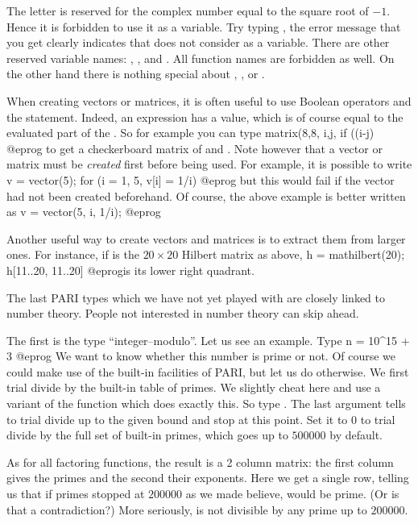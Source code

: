  The letter  is reserved for the complex number
equal to the square root of $-1$. Hence it is forbidden to use it as a
variable. Try typing , the error message that you
get clearly indicates that  does not consider  as a variable.
There are other reserved variable names: , ,
 and . All function names are forbidden as well. On the
other hand there is nothing special about , ,  or
.

When creating vectors or matrices, it is often useful to use Boolean
operators and the  statement. Indeed, an  expression has a
value, which is of course equal to the evaluated part of the . So for
example you can type
\bprog
  matrix(8,8, i,j, if ((i-j)%
@eprog\noindent
to get a checkerboard matrix of  and . Note however
that a vector or matrix must be \emph{created} first before being used. For
example, it is possible to write
\bprog
  v = vector(5);
  for (i = 1, 5, v[i] = 1/i)
@eprog\noindent
but this would fail if the vector  had not been created beforehand.
Of course, the above example is better written as
\bprog
  v = vector(5, i, 1/i);
@eprog

Another useful way to create vectors and matrices is to extract them from
larger ones. For instance, if  is the $20\times 20$ Hilbert matrix as above,
\bprog
  h = mathilbert(20);
  h[11..20, 11..20]
@eprog\noindent is its lower right quadrant.

\medskip The last PARI types which we have not yet played with are closely
linked to number theory. People not interested in number theory can skip
ahead.

The first is the type ``integer--modulo''. Let us see an example. Type
\bprog
  n = 10^15 + 3
@eprog
We want to know whether this number is prime or not. Of course we could make
use of the built-in facilities of PARI, but let us do otherwise. We first
trial divide by the built-in table of primes. We slightly cheat here and use
a variant of the function  which does exactly this. So type
. The last argument tells  to trial divide
up to the given bound and stop at this point. Set it to 0 to trial divide by
the full set of built-in primes, which goes up to $500000$ by default.

As for all factoring functions, the result is a 2 column matrix: the first
column gives the primes and the second their exponents. Here we get a single
row, telling us that if primes stopped at $200000$ as we made 
believe,  would be prime. (Or is that a contradiction?) More
seriously,  is not divisible by any prime up to $200000$.

